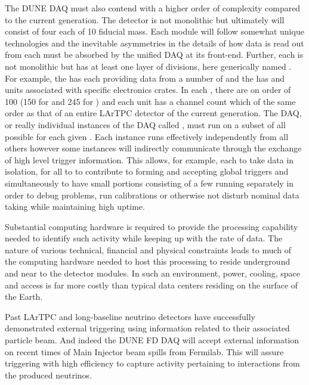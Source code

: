The DUNE  DAQ must also contend with a higher order of
complexity compared to the current generation. 
The  detector is not monolithic but ultimately will consist
of four  each of \SI{10}{\kton} fiducial mass. 
Each module will follow somewhat unique technologies and the
inevitable asymmetries in the details of how data is read out from
each must be absorbed by the unified DAQ at its front-end. 
Further, each  is not monolithic but has at least one
layer of divisions, here generically named . 
For example, the   has  each
providing data from a number of  and the  has
 and  units associated with specific electronics
crates.
In each , there are on order of 100 
(150 for  and 245 for ) and each unit has a
channel count which of the same order as that of an entire LArTPC
detector of the current generation.
The DAQ, or really individual instances of the DAQ called
, must run on a subset of all possible
 for each given . 
Each instance runs effectively independently from all others however
some instances will indirectly communicate through the exchange of
high level trigger information. 
This allows, for example, each  to take data in
isolation, for all to  to contribute to forming and
accepting global  triggers and simultaneously to have small
portions consisting of a few  running separately in
order to debug problems, run calibrations or otherwise not disturb
nominal data taking while maintaining high uptime.

Substantial computing hardware is required to provide the processing
capability needed to identify such activity while keeping up with the
rate of data.
The nature of various technical, financial and physical constraints
leads to much of the computing hardware needed to host this processing
to reside underground and near to the detector modules. 
In such an environment, power, cooling, space and access is far more
costly than typical data centers residing on the surface of the Earth.

Past LArTPC and long-baseline neutrino detectors have successfully
demonstrated external triggering using information related to their
associated particle beam. 
And indeed the DUNE FD DAQ will accept external information on recent
times of Main Injector beam spills from Fermilab. 
This will assure triggering with high efficiency to capture activity
pertaining to interactions from the produced neutrinos. 


